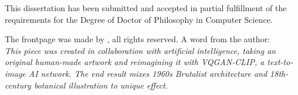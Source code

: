
\vspace*{\fill}
\begin{center}
This dissertation has been submitted and accepted in partial fulfillment of
the requirements for the Degree of Doctor of Philosophy in
Computer Science.

\end{center}

\vspace*{\fill}
\vspace*{\fill}
\vspace*{\fill}
\newpage


\vspace*{\fill}
\begin{center}

The frontpage was made by \href{https://www.unlimiteddreamco.xyz/}, all rights reserved.
A word from the author: \\
\textit{This piece was created in collaboration with artificial intelligence, taking an original human-made artwork and reimagining it with VQGAN-CLIP, a text-to-image AI network. The end result mixes 1960s Brutalist architecture and 18th-century botanical illustration to unique effect.}

\end{center}
\vspace*{\fill}
\vspace*{\fill}
\vspace*{\fill}
